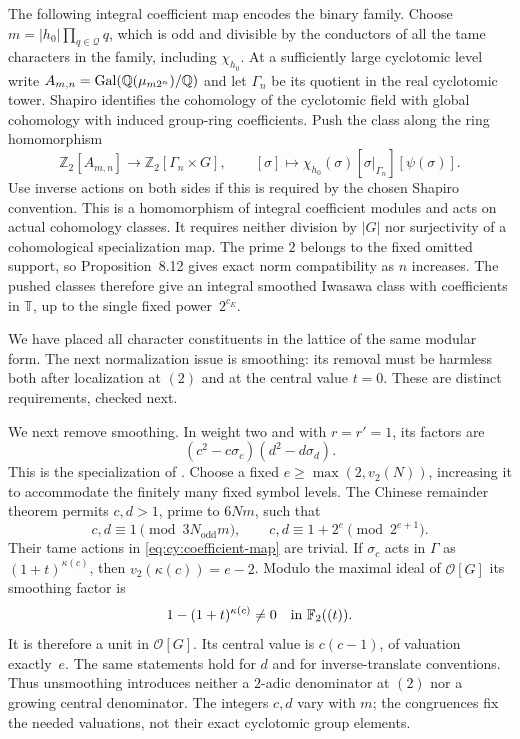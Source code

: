 The following integral coefficient map encodes the binary family. Choose
$m=|h_0|\prod_{q\in\mathcal Q}q$, which is odd and divisible by the
conductors of all the tame characters in the family, including
$\chi_{h_0}$.  At a sufficiently large
cyclotomic level write $A_{m,n}=\operatorname{Gal}(\mathbb Q(\mu_{m2^n})/\mathbb Q)$
and let $\Gamma_n$ be its quotient in the real cyclotomic tower.  Shapiro identifies the cohomology of the cyclotomic field
with global cohomology with induced group-ring coefficients.  Push the
class along the ring homomorphism
\begin{equation}\label{eq:cy:coefficient-map}
 \mathbb Z _2[A_{m,n}]\longrightarrow
       \mathbb Z _2[\Gamma_n\times G],\qquad
 [\sigma]\longmapsto
       \chi_{h_0}(\sigma)[\sigma|_{\Gamma_n}][\psi(\sigma)].
\end{equation}
Use inverse actions on both sides if this is required by the chosen
Shapiro convention.  This is a homomorphism of integral coefficient
modules and acts on actual cohomology classes.  It requires neither
division by $|G|$ nor surjectivity of a cohomological specialization map.
The prime $2$ belongs to the fixed omitted support, so Proposition~8.12
gives exact norm compatibility as $n$ increases.  The pushed classes
therefore give an integral smoothed Iwasawa class with coefficients in
$\mathbb T$, up to the single fixed power~$2^{c_E}$.

We have placed all character constituents in the lattice of the same
modular form. The next normalization issue is smoothing: its
removal must be harmless both after localization at $(2)$ and at the
central value $t=0$. These are distinct requirements, checked next.

We next remove smoothing.  In weight two and with $r=r'=1$, its factors
are
\begin{equation}\label{eq:cy:smoothing}
 (c^2-c\sigma_c)(d^2-d\sigma_d).
\end{equation}
This is the specialization of
\cite[Theorem~6.6 and (4.2.4)]{Kato2004}.  Choose a fixed
$e\geq\max(2,v_2(N))$, increasing it to accommodate the finitely many
fixed symbol levels.  The Chinese remainder theorem permits $c,d>1$,
prime to $6Nm$, such that
\[
 c,d\equiv1\pmod{3N_{\mathrm{odd}}m},\qquad
 c,d\equiv1+2^e\pmod{2^{e+1}}.
\]
Their tame actions in \eqref{eq:cy:coefficient-map} are trivial.  If
$\sigma_c$ acts in $\Gamma$ as $(1+t)^{\kappa(c)}$, then
$v_2(\kappa(c))=e-2$.  Modulo the maximal ideal of $\mathcal O[G]$ its
smoothing factor is
\[
 1-(1+t)^{\kappa(c)}\ne0\quad\hbox{in }\mathbb F _2((t)).
\]
It is therefore a unit in $\mathcal O[G]$.  Its central value is
$c(c-1)$, of valuation exactly~$e$.  The same statements hold for $d$
and for inverse-translate conventions.  Thus unsmoothing introduces
neither a $2$-adic denominator at $(2)$ nor a growing central denominator.
The integers $c,d$ vary with $m$; the congruences fix the needed valuations,
not their exact cyclotomic group elements.

